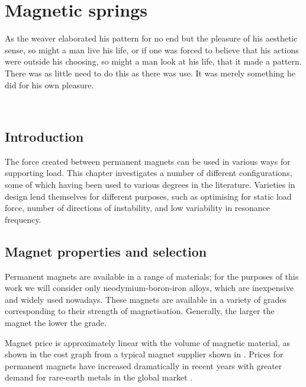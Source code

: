 \documentclass[11pt,a4paper]{memoir}
\begin{document}
\chapter{Magnetic springs}

\epigraph {
  As the weaver elaborated his pattern for no end but the pleasure of his aesthetic sense, so might a man live his life, or if one was forced to believe that his actions were outside his choosing, so might a man look at his life, that it made a pattern.
  There was as little need to do this as there was use.
  It was merely something he did for his own pleasure.
}
{\\\textcite{maugham1915}}

\section{Introduction}

The force created between permanent magnets can be used in various ways for supporting load.
This chapter investigates a number of different configurations, some of which having been used to various degrees in the literature.
Varieties in design lend themselves for different purposes, such as optimising for static load force, number of directions of instability, and low variability in resonance frequency.


\section{Magnet properties and selection}

Permanent magnets are available in a range of materials; for the purposes of this work we will consider only neodymium-boron-iron alloys, which are inexpensive and widely used nowadays.
These magnets are available in a variety of grades corresponding to their strength of magnetisation.
Generally, the larger the magnet the lower the grade.

Magnet price is approximately linear with the volume of magnetic material, as shown in the cost graph from a typical magnet supplier shown in .
Prices for permanent magnets have increased dramatically in recent years with greater demand for rare-earth metals in the global market \cite{coey2011-ietm}.
\end{document}
